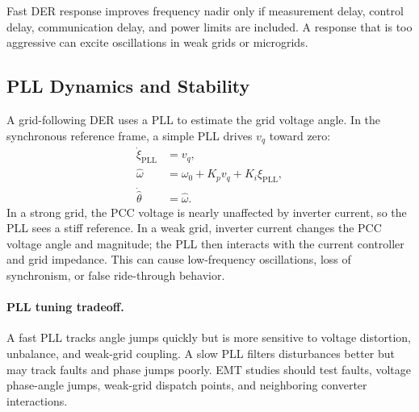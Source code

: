 \documentclass[11pt]{article}
\begin{document}
\begin{tcolorbox}[colback=yellow!6,colframe=yellow!45!black,title=Low-Inertia Design Issue]
Fast DER response improves frequency nadir only if measurement delay, control
delay, communication delay, and power limits are included. A response that is
too aggressive can excite oscillations in weak grids or microgrids.
\end{tcolorbox}

\subsection{PLL Dynamics and Stability}
A grid-following DER uses a PLL to estimate the grid voltage angle. In the
synchronous reference frame, a simple PLL drives $v_q$ toward zero:
\begin{align}
\dot{\xi}_{\mathrm{PLL}} &= v_q,\\
\hat{\omega} &= \omega_0+K_p v_q+K_i\xi_{\mathrm{PLL}},\\
\dot{\hat{\theta}} &= \hat{\omega}.
\end{align}
In a strong grid, the PCC voltage is nearly unaffected by inverter current, so
the PLL sees a stiff reference. In a weak grid, inverter current changes the PCC
voltage angle and magnitude; the PLL then interacts with the current controller
and grid impedance. This can cause low-frequency oscillations, loss of
synchronism, or false ride-through behavior.

\paragraph{PLL tuning tradeoff.}
A fast PLL tracks angle jumps quickly but is more sensitive to voltage
distortion, unbalance, and weak-grid coupling. A slow PLL filters disturbances
better but may track faults and phase jumps poorly. EMT studies should test
faults, voltage phase-angle jumps, weak-grid dispatch points, and neighboring
converter interactions.
\end{document}
